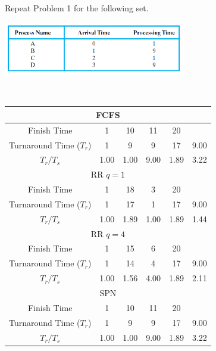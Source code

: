 \documentclass[12pt]{article}
\newenvironment{sol}[1][Solution]{\begin{trivlist}\item[\hskip\labelsep {\bfseries #1:}]}{\end{trivlist}}
\begin{document}
\begin{enumerate}
\begin{sol}
\begin{center}
    \end{center}
    \end{sol}
    
    \newpage
    \item Repeat Problem 1 for the following set.
    \begin{center}
        \includegraphics[width=0.6\textwidth]{3.png}
    \end{center}
        \begin{sol}
    \hspace*{\fill}\\
    \begin{center}
        
    \begin{tabular}{|c|c|c|c|c|c|}
        \hline
        \multicolumn{6}{|c|}{FCFS}  \\
        \hline 
         Finish Time & 1 & 10 & 11 & 20 &  \\
        \hline
         Turnaround Time ($T_r$) & 1 & 9 & 9 & 17 & 9.00  \\ 
        \hline
         $T_r / T_s$ & 1.00 & 1.00 & 9.00 & 1.89 & 3.22  \\
         \hline
         
        \multicolumn{6}{|c|}{RR $q = 1$}\\
        \hline 
         Finish Time & 1 & 18 & 3 & 20 &  \\
        \hline
         Turnaround Time ($T_r$) & 1 & 17 & 1 & 17 & 9.00  \\ 
        \hline
         $T_r / T_s$ & 1.00 & 1.89 & 1.00 & 1.89 & 1.44  \\
         \hline
                  
        \multicolumn{6}{|c|}{RR $q = 4$}\\
        \hline 
         Finish Time & 1 & 15 & 6 & 20 &  \\
        \hline
         Turnaround Time ($T_r$) & 1 & 14 & 4 & 17 & 9.00  \\ 
        \hline
         $T_r / T_s$ & 1.00 & 1.56 & 4.00 & 1.89 & 2.11 \\
         \hline
                  
        \multicolumn{6}{|c|}{SPN}\\
        \hline 
         Finish Time & 1 & 10 & 11 & 20 &  \\
        \hline
         Turnaround Time ($T_r$) & 1 & 9 & 9 & 17 & 9.00  \\ 
        \hline
         $T_r / T_s$ & 1.00 & 1.00 & 9.00 & 1.89 & 3.22  \\
         \hline
                  

\end{tabular}
\end{center}
\end{sol}
\end{enumerate}
\end{document}
